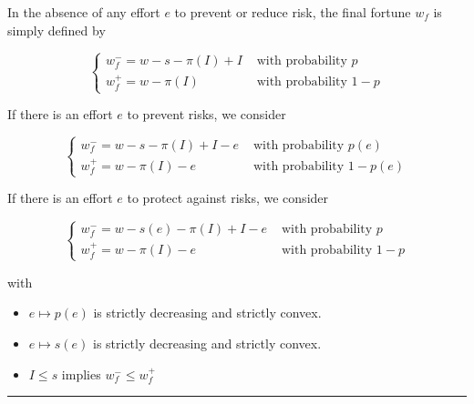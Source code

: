 \begin{f}
 In the absence of any effort \(e\) to prevent or reduce risk, the final fortune \(w_{f}\) is simply defined by

\[
\begin{cases}w_{f}^{-}=w-s-\pi(I)+I & \text { with probability } p \\ w_{f}^{+}=w-\pi(I) & \text { with probability } 1-p\end{cases}
\]

If there is an effort \(e\) to prevent risks, we consider

\[
\begin{cases}w_{f}^{-}=w-s-\pi(I)+I-e & \text { with probability } p(e) \\ w_{f}^{+}=w-\pi(I)-e & \text { with probability } 1-p(e)\end{cases}
\]

If there is an effort \(e\) to protect against risks, we consider

\[
\begin{cases}w_{f}^{-}=w-s(e)-\pi(I)+I-e & \text { with probability } p \\ w_{f}^{+}=w-\pi(I)-e & \text { with probability } 1-p\end{cases}
\]

with
\begin{itemize}
	\item \(e \mapsto p(e)\) is strictly decreasing and strictly convex.
	\item \(e \mapsto s(e)\) is strictly decreasing and strictly convex.\\
	\item \(I \leq s\) implies \(w_{f}^{-} \leq w_{f}^{+}\)
\end{itemize}

\end{f}
\hrule


